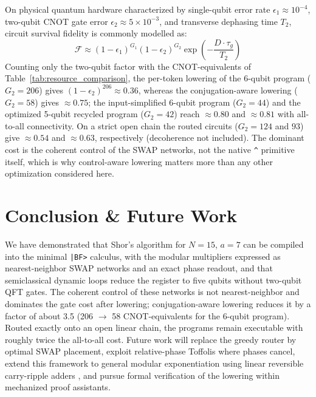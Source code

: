 \documentclass[11pt,a4paper,twocolumn]{article}
\begin{document}
On physical quantum hardware characterized by single-qubit error rate $\epsilon_1 \approx 10^{-4}$, two-qubit CNOT gate error $\epsilon_2 \approx 5 \times 10^{-3}$, and transverse dephasing time $T_2$, circuit survival fidelity is commonly modelled as:
\begin{equation}
    \mathcal{F} \approx (1 - \epsilon_1)^{G_1} (1 - \epsilon_2)^{G_2} \exp\!\left(-\frac{D \cdot \tau_g}{T_2}\right)
\end{equation}
Counting only the two-qubit factor with the CNOT-equivalents of Table~\ref{tab:resource_comparison}, the per-token lowering of the 6-qubit program ($G_2 = 206$) gives $(1-\epsilon_2)^{206} \approx 0.36$, whereas the conjugation-aware lowering ($G_2 = 58$) gives $\approx 0.75$; the input-simplified 6-qubit program ($G_2 = 44$) and the optimized 5-qubit recycled program ($G_2 = 42$) reach $\approx 0.80$ and $\approx 0.81$ with all-to-all connectivity. On a strict open chain the routed circuits ($G_2 = 124$ and $93$) give $\approx 0.54$ and $\approx 0.63$, respectively (decoherence not included). The dominant cost is the coherent control of the SWAP networks, not the native \texttt{\^{}} primitive itself, which is why control-aware lowering matters more than any other optimization considered here.

\section{Conclusion \& Future Work}

We have demonstrated that Shor's algorithm for $N = 15$, $a = 7$ can be compiled into the minimal \texttt{|BF>} calculus, with the modular multipliers expressed as nearest-neighbor SWAP networks and an exact phase readout, and that semiclassical dynamic loops reduce the register to five qubits without two-qubit QFT gates. The coherent control of these networks is not nearest-neighbor and dominates the gate cost after lowering; conjugation-aware lowering reduces it by a factor of about 3.5 (206 $\to$ 58 CNOT-equivalents for the 6-qubit program). Routed exactly onto an open linear chain, the programs remain executable with roughly twice the all-to-all cost. Future work will replace the greedy router by optimal SWAP placement, exploit relative-phase Toffolis where phases cancel, extend this framework to general modular exponentiation using linear reversible carry-ripple adders \cite{fowler2004lnn,beauregard2003circuit}, and pursue formal verification of the lowering within mechanized proof assistants.
\end{document}
